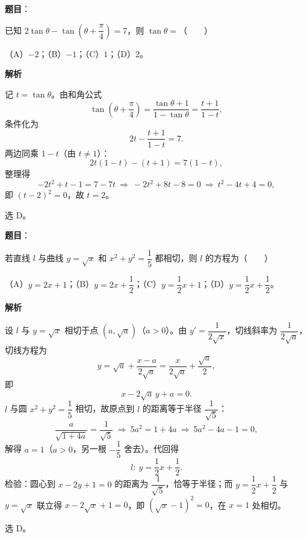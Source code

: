 \begin{answer}

\textbf{题目}：

已知 $2\tan\theta-\tan\left(\theta+\dfrac\pi4\right)=7$，则 $\tan\theta=$\mbox{（　　）}

（A）$-2$；（B）$-1$；（C）$1$；（D）$2$。

\textbf{解析}

记 $t=\tan\theta$。由和角公式
\nopagebreak[4]
\[\tan\left(\theta+\frac\pi4\right)=\frac{\tan\theta+1}{1-\tan\theta}=\frac{t+1}{1-t},\]
条件化为
\nopagebreak[4]
\[2t-\frac{t+1}{1-t}=7 .\]
两边同乘 $1-t$（由 $t\neq1$）：
\nopagebreak[4]
\[2t(1-t)-(t+1)=7(1-t),\]
整理得
\nopagebreak[4]
\[-2t^2+t-1=7-7t\ \Longrightarrow\ -2t^2+8t-8=0\ \Longrightarrow\ t^2-4t+4=0,\]
即 $(t-2)^2=0$，故 $t=2$。

选 D。


\end{answer}
\begin{answer}

\textbf{题目}：

若直线 $l$ 与曲线 $y=\sqrt x$ 和 $x^2+y^2=\dfrac15$ 都相切，则 $l$ 的方程为\mbox{（　　）}

（A）$y=2x+1$；（B）$y=2x+\dfrac12$；（C）$y=\dfrac12x+1$；（D）$y=\dfrac12x+\dfrac12$。

\textbf{解析}

设 $l$ 与 $y=\sqrt x$ 相切于点 $(a,\sqrt a)$（$a>0$）。由 $y'=\dfrac1{2\sqrt x}$，切线斜率为 $\dfrac1{2\sqrt a}$，切线方程为
\nopagebreak[4]
\[y=\sqrt a+\frac{x-a}{2\sqrt a}=\frac{x}{2\sqrt a}+\frac{\sqrt a}2,\]
即
\nopagebreak[4]
\[x-2\sqrt a\,y+a=0 .\]
$l$ 与圆 $x^2+y^2=\dfrac15$ 相切，故原点到 $l$ 的距离等于半径 $\dfrac1{\sqrt5}$：
\nopagebreak[4]
\[\frac{a}{\sqrt{1+4a}}=\frac1{\sqrt5}\ \Longrightarrow\ 5a^2=1+4a\ \Longrightarrow\ 5a^2-4a-1=0,\]
解得 $a=1$（$a>0$，另一根 $-\dfrac15$ 舍去）。代回得
\nopagebreak[4]
\[l:\ y=\frac12x+\frac12 .\]
检验：圆心到 $x-2y+1=0$ 的距离为 $\dfrac{1}{\sqrt5}$，恰等于半径；而 $y=\dfrac12x+\dfrac12$ 与 $y=\sqrt x$ 联立得 $x-2\sqrt x+1=0$，即 $(\sqrt x-1)^2=0$，在 $x=1$ 处相切。

选 D。


\end{answer}
